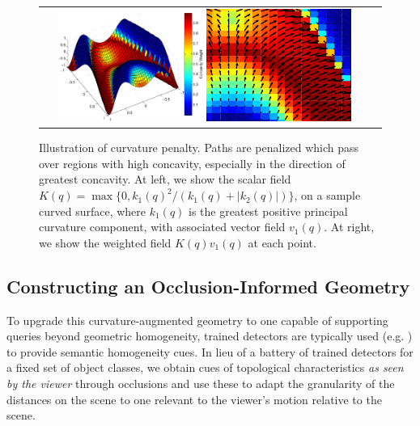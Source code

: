  \begin{figure}
  \centering
 \begin{tabular}{cc}
 \includegraphics[width=0.45\textwidth]{figs/concavity.pdf}\qquad
 \includegraphics[width=0.45\textwidth]{figs/concavity_vectors.pdf}
 \end{tabular}

 \caption{\small Illustration of curvature penalty.  Paths are penalized
 which pass over regions with high concavity, especially in the direction of greatest concavity.
 At left, we show the scalar field $K(q)=\max\{0,k_1(q)^2/(k_1(q)+|k_2(q)|)\}$, on a sample curved surface, 
 where $k_1(q)$ is the greatest positive
 principal curvature component, with associated vector field $v_1(q)$.  
 At right, we show the weighted field $K(q)v_1(q)$ at each point.
 }\label{fig:concavity}
\vspace{-0.2in}
 \end{figure}
\subsection{Constructing an Occlusion-Informed Geometry}\label{sec:geomOfObjs}
To upgrade this curvature-augmented geometry to one capable of supporting queries beyond geometric homogeneity, trained
detectors are typically used (e.g. \cite{haene2013, kundu2014}) to provide
semantic homogeneity cues. In lieu of a battery of
trained detectors for a fixed set of object classes, we obtain cues of topological characteristics \emph{as seen by the viewer} through occlusions
and use these to adapt the granularity of the distances on the scene to one relevant to the viewer's motion relative to the scene.
